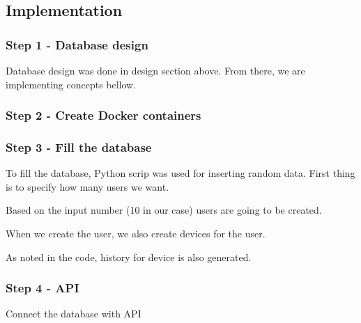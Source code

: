 \subsection{Implementation}
\subsubsection{Step 1 - Database design}
Database design was done in design section above. From there, we are implementing concepts bellow.

\subsubsection{Step 2 - Create Docker containers}






\subsubsection{Step 3 - Fill the database}
To fill the database, Python scrip was used for inserting random data.
\newline
First thing is to specify how many users we want. 

Based on the input number (10 in our case) users are going to be created.

When we create the user, we also create devices for the user.

As noted in the code, history for device is also generated.


\subsubsection{Step 4 - API}
Connect the database with API


